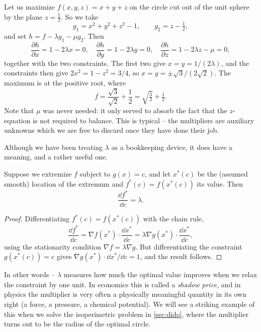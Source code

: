 \documentclass[a4paper]{scrartcl}
\begin{document}
\begin{example}
	Let us maximize $f(x, y, z) = x + y + z$ on the circle cut out of the unit sphere by the plane $z = \frac{1}{2}$. So we take
	$$
	g_1 = x^2 + y^2 + z^2 - 1, \qquad g_2 = z - \tfrac{1}{2},
	$$
	and set $h = f - \lambda g_1 - \mu g_2$. Then
	$$
	\frac{\partial h}{\partial x} = 1 - 2\lambda x = 0, \quad \frac{\partial h}{\partial y} = 1 - 2 \lambda y = 0, \quad \frac{\partial h}{\partial z} = 1 - 2 \lambda z - \mu = 0,
	$$
	together with the two constraints. The first two give $x = y = 1/(2\lambda)$, and the constraints then give $2x^2 = 1 - z^2 = 3/4$, so $x = y = \pm\sqrt{3}/(2\sqrt{2})$. The maximum is at the positive root, where
	$$
	f = \frac{\sqrt{3}}{\sqrt{2}} + \frac{1}{2} = \sqrt{\tfrac{3}{2}} + \tfrac{1}{2}.
	$$
	Note that $\mu$ was never needed: it only served to absorb the fact that the $z$-equation is not required to balance. This is typical -- the multipliers are auxiliary unknowns which we are free to discard once they have done their job.
\end{example}

Although we have been treating $\lambda$ as a bookkeeping device, it does have a meaning, and a rather useful one.

\begin{proposition}
	Suppose we extremize $f$ subject to $g(x) = c$, and let $x^*(c)$ be the (assumed smooth) location of the extremum and $f^*(c) = f(x^*(c))$ its value. Then
	$$
	\frac{\dd f^*}{\dd c} = \lambda.
	$$
\end{proposition}
\begin{proof}
	Differentiating $f^*(c) = f(x^*(c))$ with the chain rule,
	$$
	\frac{\dd f^*}{\dd c} = \nabla f(x^*) \cdot \frac{\dd x^*}{\dd c} = \lambda \nabla g(x^*) \cdot \frac{\dd x^*}{\dd c},
	$$
	using the stationarity condition $\nabla f = \lambda \nabla g$. But differentiating the constraint $g(x^*(c)) = c$ gives $\nabla g(x^*) \cdot \dd x^*/\dd c = 1$, and the result follows.
\end{proof}

In other words -- $\lambda$ measures how much the optimal value improves when we relax the constraint by one unit. In economics this is called a \emph{shadow price}, and in physics the multiplier is very often a physically meaningful quantity in its own right (a force, a pressure, a chemical potential). We will see a striking example of this when we solve the isoperimetric problem in \autoref{sec:dido}, where the multiplier turns out to be the radius of the optimal circle.
\end{document}
